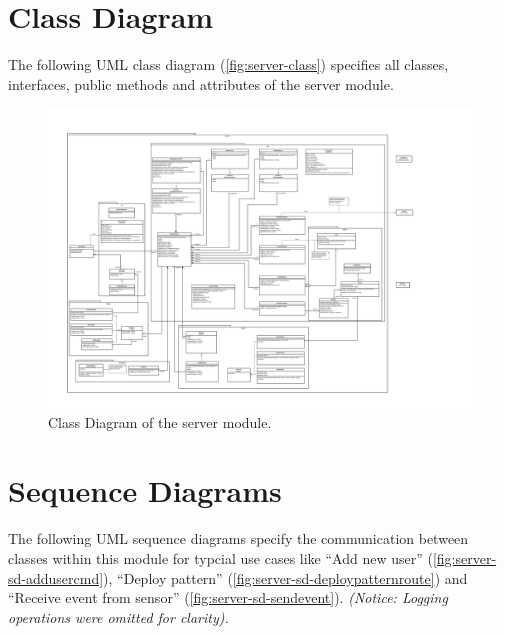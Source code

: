 \section{Class Diagram}
The following UML class diagram (\autoref{fig:server-class}) specifies all
classes, interfaces, public methods and attributes of the server module.

\FloatBarrier
\begin{figure}[h]
    \centering
    \includegraphics[width=\textwidth]{../module_res/server-class.pdf}
    \caption{Class Diagram of the server module.
    \label{fig:server-class}}
\end{figure}
\FloatBarrier


\section{Sequence Diagrams}
The following UML sequence diagrams specify the communication between classes
within this module for typcial use cases like
\enquote{Add new user} (\autoref{fig:server-sd-addusercmd}),
\enquote{Deploy pattern} (\autoref{fig:server-sd-deploypatternroute}) and
\enquote{Receive event from sensor} (\autoref{fig:server-sd-sendevent}).
\emph{(Notice: Logging operations were omitted for clarity).}

